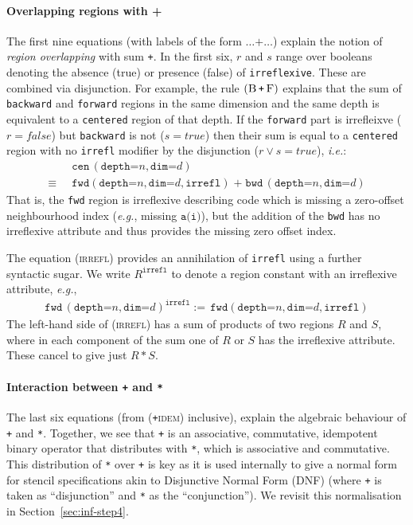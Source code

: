 \documentclass[9pt]{sigplanconf}
\theoremstyle{definition}
\newcommand{\ie}{\emph{i.e.}}
\newcommand{\eg}{\emph{e.g.}}
\newcommand{\term}[1]{\texttt{#1}}
\newcommand{\irrefl}{\texttt{irreflexive}}
\newcommand{\stenFwdS}[2]{\term{fwd} \, (\term{depth=}#1,
  \term{dim=}#2)}
\newcommand{\stenBwdS}[2]{\term{bwd} \, (\term{depth=}#1,
  \term{dim=}#2)}
\newcommand{\stenCenS}[2]{\term{cen} \, (\term{depth=}#1,
  \term{dim=}#2)}
\newcommand{\irreflS}{\texttt{irrefl}}
\newcommand{\stenFwdSR}[3]{\term{fwd} (\term{depth=}#1,
  \term{dim=}#2, #3)}
\begin{document}
\paragraph{Overlapping regions with +}
The first nine
equations (with labels of the form $\ldots \texttt{+} \ldots$)
explain the notion of \emph{region overlapping} with sum
\term{+}. In the first six, $r$ and $s$ range
over booleans denoting the absence (true) or presence (false)
of \irrefl{}. These are combined via disjunction. For example,
the rule $(\textsc{B} \, \term{+} \,
\textsc{F})$ explains that the sum of \term{backward}
and \term{forward} regions in the same dimension and the same
depth is equivalent to a \term{centered} region of that depth.
If the \term{forward} part is irrefleixve ($r =
\textit{false}$) but \term{backward} is not ($s =
\textit{true}$) then their sum is equal to a \term{centered}
region with no \irreflS{} modifier by the disjunction ($r \vee s =
\textit{true}$), \ie{}:
\begin{align*}
& \stenCenS{n}{d}  \\[-0.2em]
\equiv \;\; & \stenFwdSR{n}{d}{\irreflS} \; \texttt{+} \; \stenBwdS{n}{d}
\end{align*}
That is, the \term{fwd} region is irreflexive describing code which is missing
a zero-offset neighbourhood index (\eg{}, missing $\texttt{a(i)}$), but the addition of
the \term{bwd} has no irreflexive attribute and thus provides the
missing zero offset index.

The equation (\textsc{irrefl}) provides an annihilation of
\irreflS{} using a further syntactic sugar.
We write $R^{\irreflS}$ to denote a region constant with an
irreflexive attribute, \eg{},
\begin{align*}
\stenFwdS{n}{d}^{\irreflS}  := \,
\stenFwdSR{n}{d}{\irreflS}
\end{align*}
The left-hand side of (\textsc{irrefl}) has a sum of
products of two regions $R$ and $S$, 
where in each component of the sum one of $R$
or $S$ has the irreflexive attribute. These cancel to give
just $R \, \term{*} \, S$.


\paragraph{Interaction between \term{+} and \term{*}}

The last six equations (from (\textsc{\term{+}idem}) inclusive), explain
the algebraic behaviour of \term{+} and \term{*}.  Together, we see
that \term{+} is an associative, commutative, idempotent binary
operator that distributes with \term{*}, which is associative and
commutative. This distribution of \term{*} over \term{+} is key as it
is used internally to give a normal form for stencil specifications
akin to Disjunctive Normal Form (DNF) (where \term{+} is taken as
``disjunction'' and \term{*} as the ``conjunction''). We revisit this
normalisation in Section~\ref{sec:inf-step4}.
\end{document}
